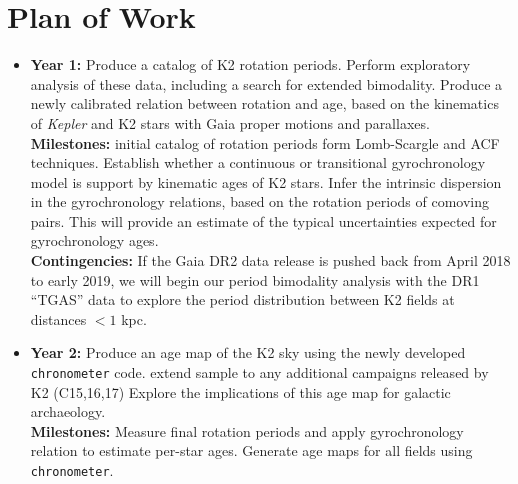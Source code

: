 \documentclass[12pt]{article}
\newcommand{\Kepler}{\textsl{Kepler}\xspace}
\begin{document}
\section{Plan of Work}



\begin{itemize}
\item {\bf Year 1:} Produce a catalog of K2 rotation periods. Perform exploratory
analysis of these data, including a search for extended bimodality.
Produce a newly calibrated relation between rotation and age,
based on the kinematics of \Kepler and K2 stars with Gaia proper motions and
parallaxes.
\\
{\bf Milestones:} initial catalog of rotation periods form Lomb-Scargle and
        ACF techniques.
        Establish whether a continuous or transitional gyrochronology model is
        support by kinematic ages of K2 stars.
        Infer the intrinsic dispersion in the gyrochronology relations, based
        on the rotation periods of comoving pairs.
        This will provide an estimate of the typical uncertainties expected
        for gyrochronology ages.
\\
{\bf Contingencies:} If the Gaia DR2 data release is pushed back from April 2018 to early 2019, we will begin our period bimodality analysis with the DR1 ``TGAS'' data to explore the period distribution between K2 fields at distances $< 1$ kpc.
\item {\bf Year 2:} Produce an age map of the K2 sky using the newly developed
{\tt chronometer} code. extend sample to any additional campaigns released by K2 (C15,16,17)
Explore the implications of this age map for galactic archaeology.
\\
{\bf Milestones:} Measure final rotation periods and apply gyrochronology relation to estimate per-star ages. Generate age maps for all fields using {\tt chronometer}.
\end{itemize}

\clearpage


\end{document}
